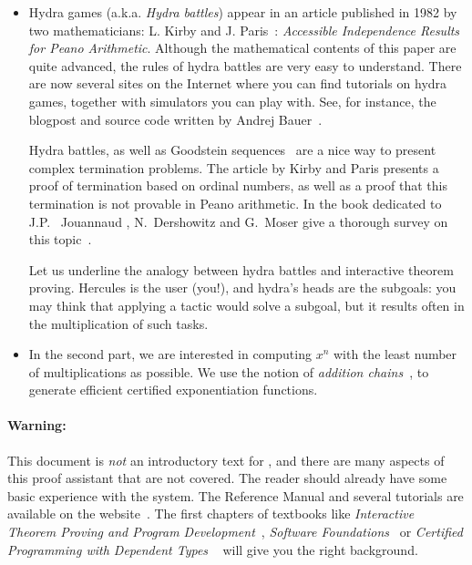 \documentclass[twoside,a4paper]{book}
\begin{document}
\begin{itemize}
\item Hydra games (a.k.a. \emph{Hydra battles}) appear in an article published in 1982 by two mathematicians:
L. Kirby and J. Paris~\cite{KP82}: \emph{Accessible Independence Results for Peano Arithmetic}. 
Although the mathematical contents of this 
paper are quite advanced, the rules of hydra battles are very easy to understand. There are now several sites on the Internet where you can find tutorials on hydra games, together with simulators you can play with. See, for instance, the blogpost and source code written by Andrej Bauer~\cite{bauer2008,BauerHydra}.



Hydra battles, as well as Goodstein sequences~\cite{goodstein_1944, KP82}
are a nice way to present complex termination problems.
The article by Kirby and Paris presents a proof of termination
based on ordinal numbers, as well as a proof that this termination is not
provable in Peano arithmetic. In the book dedicated to 
J.P. ~Jouannaud \cite{HommageJPJ}, N.~Dershowitz and G.~Moser  give a thorough survey on this topic~\cite{Dershowitz2007}.

Let us underline the analogy between hydra battles and interactive theorem proving. Hercules is the user (you!), and hydra's heads are the subgoals: you may think that applying a tactic would solve a subgoal, but it results often in the multiplication of such tasks.

\item In the second part, we are interested in computing $x^n$ with the least number of multiplications as possible. We use the notion of \emph{addition chains}~\cite{brauer1939,DBLP:journals/ipl/BerstelB87}, to generate efficient certified exponentiation functions.
\end{itemize}

\paragraph*{Warning:}

This document is \emph{not} an introductory text for \coq, and there are many aspects of this proof assistant that are not covered. 
 The reader should already have some basic experience with the \coq system. The Reference Manual and several tutorials are available on the \coq website~\cite{Coq}. The first chapters of textbooks like \emph{Interactive Theorem Proving and Program Development}~\cite{BC04}, \emph{Software Foundations}~\cite{SF} or  \emph{Certified Programming with Dependent Types} ~\cite{chlipalacpdt2011} will give you the right background.
\end{document}

